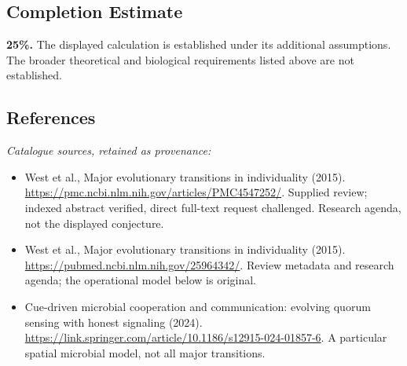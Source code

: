 \documentclass[11pt]{article}
\begin{document}
\subsection{Completion Estimate}
\textbf{25\%.} The displayed calculation is established under its additional assumptions. The broader theoretical and biological requirements listed above are not established.
\subsection{References}
\noindent\emph{Catalogue sources, retained as provenance:}
\begin{itemize}
\item West et al., Major evolutionary transitions in individuality (2015). \url{https://pmc.ncbi.nlm.nih.gov/articles/PMC4547252/}. Supplied review; indexed abstract verified, direct full-text request challenged. Research agenda, not the displayed conjecture.
\item West et al., Major evolutionary transitions in individuality (2015). \url{https://pubmed.ncbi.nlm.nih.gov/25964342/}. Review metadata and research agenda; the operational model below is original.
\item Cue-driven microbial cooperation and communication: evolving quorum sensing with honest signaling (2024). \url{https://link.springer.com/article/10.1186/s12915-024-01857-6}. A particular spatial microbial model, not all major transitions.
\end{itemize}
\end{document}
